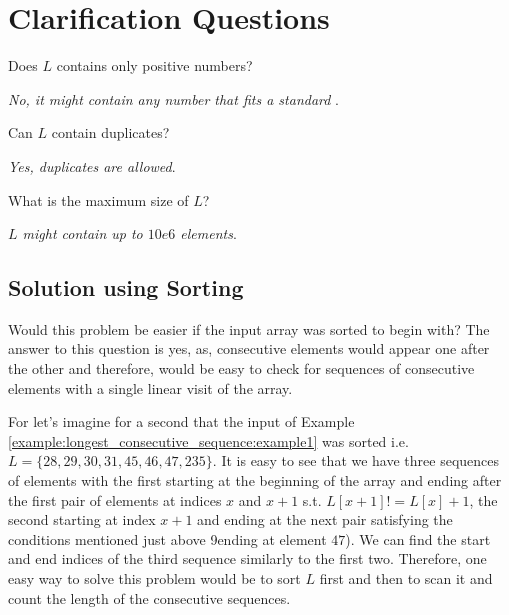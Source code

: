 \section{Clarification Questions}

\begin{QandA}
	\item Does $L$ contains only positive numbers?
	\begin{answered}
		\textit{No, it might contain any number that fits a standard }.
	\end{answered}

	\item Can $L$ contain duplicates?
	\begin{answered}
		\textit{Yes, duplicates are allowed}.
	\end{answered}

	\item What is the maximum size of $L$?
	\begin{answered}
		\textit{$L$ might contain up to $10e6$ elements}.
	\end{answered}
	
\end{QandA}

\subsection{Solution using Sorting}
\label{longest_consecutive_sequence:sec:bruteforce}
Would this problem be easier if the input array was sorted to begin with? 
The answer to this question is yes, as, consecutive elements would appear one after the other and therefore, would be easy to check for sequences of consecutive elements with a single linear visit of the array.

For let's imagine for a second that the input of  Example \ref{example:longest_consecutive_sequence:example1} was sorted i.e. $L=\{28,29,30,31,45,46,47,235\}.$ It is easy to see that we have three sequences of elements with the first starting at the beginning of the array and ending after the first pair of elements at indices $x$ and $x+1$ s.t. $L[x+1]!= L[x]+1$, the second starting at index $x+1$ and ending at the next pair satisfying the conditions mentioned just above 9ending at element $47$). We can find the start and end indices of the third sequence similarly to the first two.
Therefore, one easy way to solve this problem would be to sort $L$ first and then to scan it and count the length of the consecutive sequences. 

